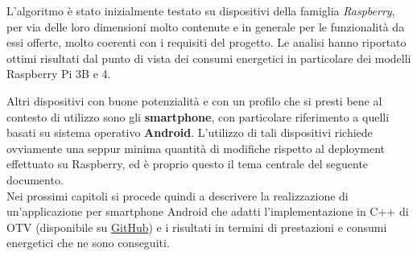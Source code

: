 L'algoritmo è stato inizialmente testato su dispositivi della famiglia \textit{Raspberry}, per via delle loro dimensioni molto
contenute e in generale per le funzionalità da essi offerte, molto coerenti con i requisiti del progetto. Le analisi hanno
riportato ottimi risultati dal punto di vista dei consumi energetici in particolare dei modelli Raspberry Pi 3B e 4.\cite{app11157027} 

Altri dispositivi con buone potenzialità e con un profilo che si presti bene al contesto di utilizzo sono gli \textbf{smartphone},
con particolare riferimento a quelli basati su sistema operativo \textbf{Android}. L'utilizzo di tali dispositivi richiede ovviamente
una seppur minima quantità di modifiche rispetto al deployment effettuato su Raspberry, ed è proprio questo il tema centrale
del seguente documento.\\
Nei prossimi capitoli si procede quindi a descrivere la realizzazione di un'applicazione per smartphone Android che adatti
l'implementazione in C++ di OTV (disponibile su \href{https://github.com/fabiotosi92/Optical-Tracking-Velocimetry}{GitHub}) 
e i risultati in termini di prestazioni e consumi energetici che ne sono conseguiti.




\clearpage{\pagestyle{empty}\cleardoublepage}